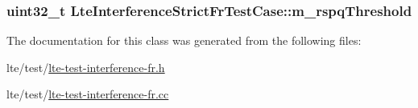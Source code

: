 \subsubsection[{\texorpdfstring{m\+\_\+rspq\+Threshold}{m_rspqThreshold}}]{\setlength{\rightskip}{0pt plus 5cm}uint32\+\_\+t Lte\+Interference\+Strict\+Fr\+Test\+Case\+::m\+\_\+rspq\+Threshold\hspace{0.3cm}{\ttfamily [private]}}\hypertarget{classLteInterferenceStrictFrTestCase_a114a0478eab1d57168b018eb23c9cfba}{}\label{classLteInterferenceStrictFrTestCase_a114a0478eab1d57168b018eb23c9cfba}


The documentation for this class was generated from the following files\+:\begin{DoxyCompactItemize}
\item 
lte/test/\hyperlink{lte-test-interference-fr_8h}{lte-\/test-\/interference-\/fr.\+h}\item 
lte/test/\hyperlink{lte-test-interference-fr_8cc}{lte-\/test-\/interference-\/fr.\+cc}\end{DoxyCompactItemize}

